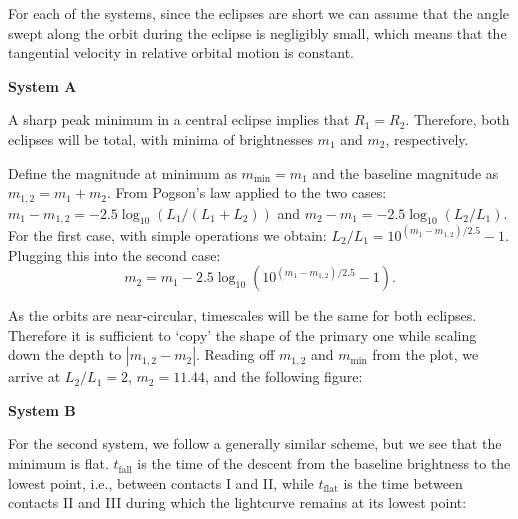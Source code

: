 
For each of the systems, since the eclipses are short we can assume that the
angle swept along the orbit during the eclipse is negligibly small, which means
that the tangential velocity in relative orbital motion is constant.

\medskip
\noindent\textbf{System A}

A sharp peak minimum in a central eclipse implies that $R_1 = R_2$. Therefore,
both eclipses will be total, with minima of brightnesses $m_1$ and $m_2$,
respectively.

Define the magnitude at minimum as $m_{\min} = m_1$ and the baseline magnitude
as $m_{1,2} = m_1 + m_2$.
From Pogson's law applied to the two cases:
$m_1 - m_{1,2} = -2.5\log_{10}\left(L_1/(L_1 + L_2)\right)$ and
$m_2 - m_1 = -2.5\log_{10}\left(L_2/L_1\right)$. For the first case, with
simple operations we obtain: $L_2/L_1 = 10^{(m_1 - m_{1,2})/2.5} - 1$.
Plugging this into the second case:
\[ m_2 = m_1 - 2.5\log_{10}\left(10^{(m_1 - m_{1,2})/2.5} - 1\right). \]

As the orbits are near-circular, timescales will be the same for both eclipses.
Therefore it is sufficient to `copy' the shape of the primary one while scaling
down the depth to $|m_{1,2} - m_2|$. Reading off $m_{1,2}$ and $m_{\min}$ from
the plot, we arrive at $L_2/L_1 = 2$, $m_2 = 11.44$, and the following figure:


\medskip
\noindent\textbf{System B}

For the second system, we follow a generally similar scheme, but we see that
the minimum is flat. $t_{\mathrm{fall}}$ is the time of the descent from the
baseline brightness to the lowest point, i.e., between contacts I and II, while
$t_{\mathrm{flat}}$ is the time between contacts II and III during which the
lightcurve remains at its lowest point:


